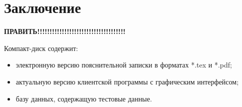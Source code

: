 \newpage
\section*{Заключение}
\textbf{ПРАВИТЬ!!!!!!!!!!!!!!!!!!!!!!!!!!!!!!!!!!!!}

\newpage
\renewcommand{\refname}{Список использованных источников}


Компакт-диск содержит: 
\begin{itemize}
\item электронную версию пояснительной записки в форматах *.tex и *.pdf;
\item актуальную версию клиентской программы с графическим интерфейсом;
\item базу данных, содержащую тестовые данные.
\end{itemize}


